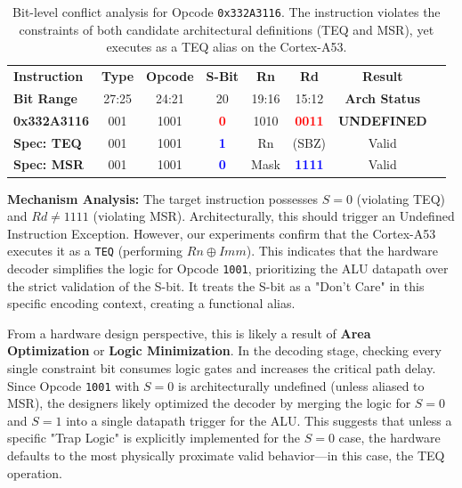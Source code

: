 \documentclass[pdflatex,sn-mathphys]{sn-jnl}%
\theoremstyle{thmstyleone}%
\theoremstyle{thmstyletwo}%
\theoremstyle{thmstylethree}%
\begin{document}
\begin{table}[h]
\centering
\caption{Bit-level conflict analysis for Opcode \texttt{0x332A3116}. The instruction violates the constraints of both candidate architectural definitions (TEQ and MSR), yet executes as a TEQ alias on the Cortex-A53.}
\label{tab:teq_alias}
\small %
\setlength{\tabcolsep}{3pt} %
\begin{tabular}{|l|c|c|c|c|c|c|c|}
\hline
\textbf{Instruction} & \textbf{Type} & \textbf{Opcode} & \textbf{S-Bit} & \textbf{Rn} & \textbf{Rd} & \textbf{Result} \\ 
\textbf{Bit Range} & \scriptsize{27:25} & \scriptsize{24:21} & \scriptsize{20} & \scriptsize{19:16} & \scriptsize{15:12} & \textbf{Arch Status} \\ \hline
\rowcolor{gray!10} 
\textbf{0x332A3116} & 001 & 1001 & \textbf{\textcolor{red}{0}} & 1010 & \textbf{\textcolor{red}{0011}} & \textbf{UNDEFINED} \\ \hline
\textbf{Spec: TEQ} & 001 & 1001 & \textbf{\textcolor{blue}{1}} & Rn & (SBZ) & Valid \\ \hline
\textbf{Spec: MSR} & 001 & 1001 & \textbf{\textcolor{blue}{0}} & Mask & \textbf{\textcolor{blue}{1111}} & Valid \\ \hline
\end{tabular}
\end{table}

\textbf{Mechanism Analysis:} The target instruction possesses $S=0$ (violating TEQ) and $Rd \neq 1111$ (violating MSR). Architecturally, this should trigger an Undefined Instruction Exception. However, our experiments confirm that the Cortex-A53 executes it as a \texttt{TEQ} (performing $Rn \oplus Imm$). This indicates that the hardware decoder simplifies the logic for Opcode \texttt{1001}, prioritizing the ALU datapath over the strict validation of the S-bit. It treats the S-bit as a "Don't Care" in this specific encoding context, creating a functional alias.

From a hardware design perspective, this is likely a result of \textbf{Area Optimization} or \textbf{Logic Minimization}. In the decoding stage, checking every single constraint bit consumes logic gates and increases the critical path delay. Since Opcode \texttt{1001} with $S=0$ is architecturally undefined (unless aliased to MSR), the designers likely optimized the decoder by merging the logic for $S=0$ and $S=1$ into a single datapath trigger for the ALU. This suggests that unless a specific "Trap Logic" is explicitly implemented for the $S=0$ case, the hardware defaults to the most physically proximate valid behavior—in this case, the TEQ operation.
\end{document}
